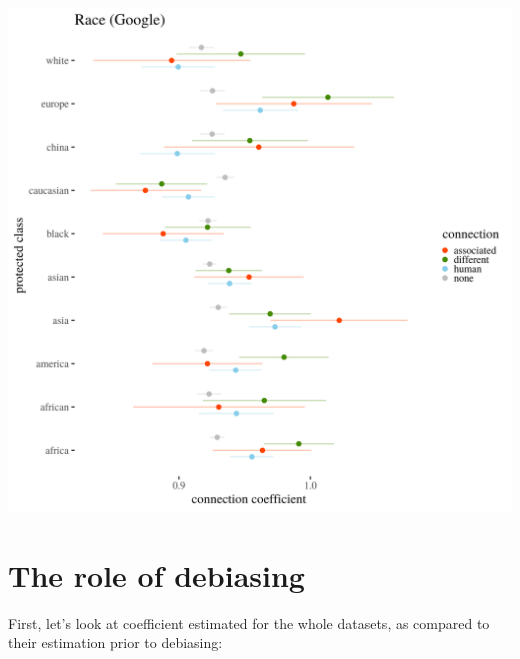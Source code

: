 \documentclass[12pt,]{book}
\begin{document}
\includegraphics[width=14cm]{../images/visRaceGoogle.png}

\chapter{The role of debiasing}\label{the-role-of-debiasing}


First, let's look at coefficient estimated for the whole datasets, as
compared to their estimation prior to debiasing:
\end{document}
